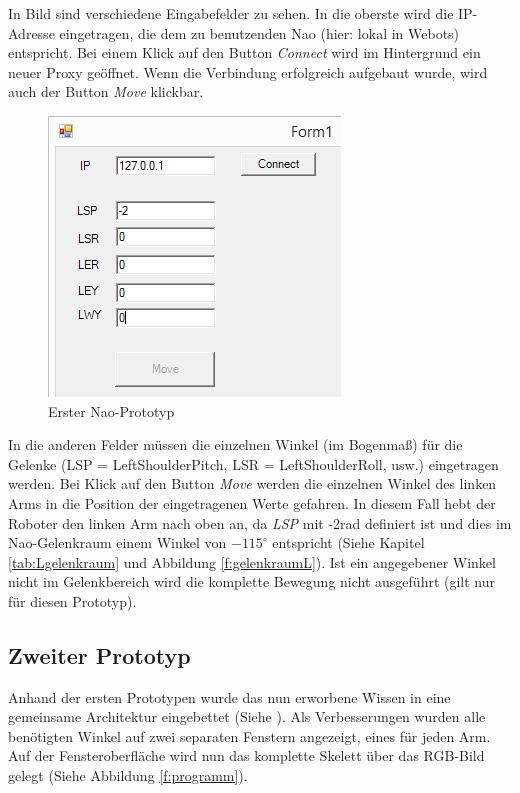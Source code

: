 In Bild  sind verschiedene Eingabefelder zu sehen. In die oberste wird die IP-Adresse eingetragen, die dem zu benutzenden Nao (hier: lokal in Webots) entspricht. Bei einem Klick auf den Button \textit{Connect} wird im Hintergrund ein neuer Proxy geöffnet. Wenn die Verbindung erfolgreich aufgebaut wurde, wird auch der Button \textit{Move} klickbar.
\begin{figure}[H]						
	\centering							
	\includegraphics[scale=0.8]{Bilder/nao_prototyp1.PNG}
	\caption{Erster Nao-Prototyp}						
	\label{f:nao_prototyp1}						
\end{figure}
\noindent
In die anderen Felder müssen die einzelnen Winkel (im Bogenmaß) für die Gelenke (LSP = LeftShoulderPitch, LSR = LeftShoulderRoll, usw.) eingetragen werden. Bei Klick auf den Button \textit{Move} werden die einzelnen Winkel des linken Arms in die Position der eingetragenen Werte gefahren. In diesem Fall hebt der Roboter den linken Arm nach oben an, da \textit{LSP} mit -2rad definiert ist und dies im Nao-Gelenkraum einem Winkel von $-115^{\circ}$ entspricht (Siehe Kapitel \ref{tab:Lgelenkraum} und Abbildung \ref{f:gelenkraumL}). Ist ein angegebener Winkel nicht im Gelenkbereich wird die komplette Bewegung nicht ausgeführt (gilt nur für diesen Prototyp).

\subsection{Zweiter Prototyp}
Anhand der ersten Prototypen wurde das nun erworbene Wissen in eine gemeinsame Architektur eingebettet (Siehe ). Als Verbesserungen wurden alle benötigten Winkel auf zwei separaten Fenstern angezeigt, eines für jeden Arm. Auf der Fensteroberfläche wird nun das komplette Skelett über das RGB-Bild gelegt (Siehe Abbildung \ref{f:programm}).


